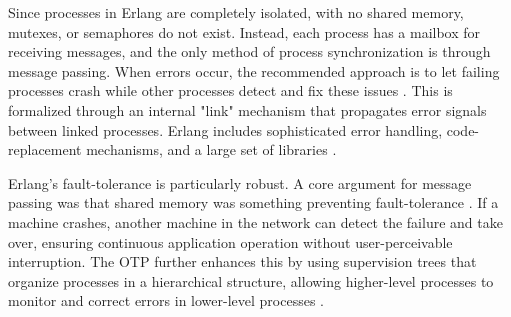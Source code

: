 \documentclass[]{final}
\begin{document}
Since processes in Erlang are completely isolated, with no shared memory, mutexes,
or semaphores do not exist. Instead, each process has a mailbox for receiving messages,
and the only method of process synchronization is through message passing.
When errors occur, the recommended approach is to let failing processes
crash while other processes detect and fix these issues \cite{armstrong_erlang_2010}.
This is formalized
through an internal "link" mechanism that propagates error signals between
linked processes. Erlang includes sophisticated error handling, code-replacement
mechanisms, and a large set of libraries \cite{armstrong_erlang_2010}.

Erlang's fault-tolerance is particularly robust.
A core argument for message passing was that shared memory was something
preventing fault-tolerance \cite{armstrong_erlang_2010}.
If a machine crashes, another
machine in the network can detect the failure and take over, ensuring continuous
application operation without user-perceivable interruption. The OTP further
enhances this by using supervision trees that
organize processes in a hierarchical structure, allowing higher-level processes
to monitor and correct errors in lower-level processes \cite{armstrong_erlang_2010}.
\end{document}
